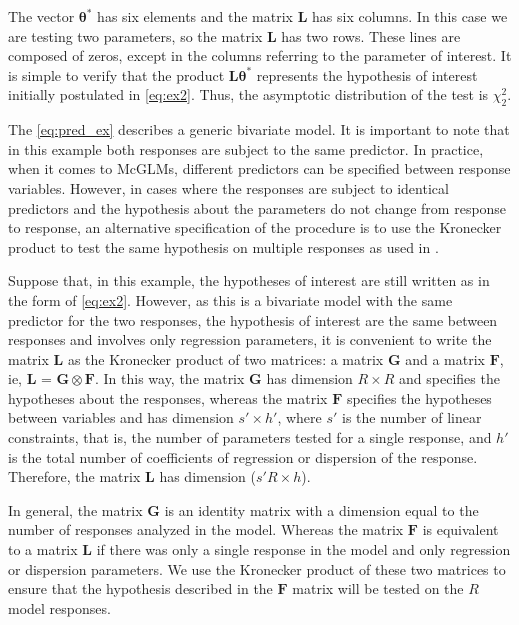 \documentclass[article]{jss}\usepackage[]{graphicx}\usepackage[]{xcolor}
\begin{document}
The vector $\boldsymbol{\theta^{*}}$ has six elements and the matrix $\boldsymbol{L}$ has six columns. In this case we are testing two parameters, so the matrix $\boldsymbol{L}$ has two rows. These lines are composed of zeros, except in the columns referring to the parameter of interest. It is simple to verify that the product $\boldsymbol{L}\boldsymbol{\theta^{*}}$ represents the hypothesis of interest initially postulated in \autoref{eq:ex2}. Thus, the asymptotic distribution of the test is $\chi^2_2$.

The \autoref{eq:pred_ex} describes a generic bivariate model. It is important to note that in this example both responses are subject to the same predictor. In practice, when it comes to McGLMs, different predictors can be specified between response variables. However, in cases where the responses are subject to identical predictors and the hypothesis about the parameters do not change from response to response, an alternative specification of the procedure is to use the Kronecker product to test the same hypothesis on multiple responses as used in \citet{plastica}.

Suppose that, in this example, the hypotheses of interest are still written as in the form of \autoref{eq:ex2}. However, as this is a bivariate model with the same predictor for the two responses, the hypothesis of interest are the same between responses and involves only regression parameters, it is convenient to write the matrix $\boldsymbol{L}$ as the Kronecker product of two matrices: a matrix $\boldsymbol{G}$ and a matrix $\boldsymbol{F}$, ie, $\boldsymbol{L}$ = $\boldsymbol{G} \otimes \boldsymbol{F}$. In this way, the matrix $\boldsymbol{G}$ has dimension $R \times R$ and specifies the hypotheses about the responses, whereas the matrix $\boldsymbol{F}$ specifies the hypotheses between variables and has dimension ${s}' \times {h}'$, where ${s}'$ is the number of linear constraints, that is, the number of parameters tested for a single response, and ${h}'$ is the total number of coefficients of regression or dispersion of the response. Therefore, the matrix $\boldsymbol{L}$ has dimension (${s}'R \times h$).

In general, the matrix $\boldsymbol{G}$ is an identity matrix with a dimension equal to the number of responses analyzed in the model. Whereas the matrix $\boldsymbol{F}$ is equivalent to a matrix $\boldsymbol{L}$ if there was only a single response in the model and only regression or dispersion parameters. We use the Kronecker product of these two matrices to ensure that the hypothesis described in the $\boldsymbol{F}$ matrix will be tested on the $R$ model responses.
\end{document}
